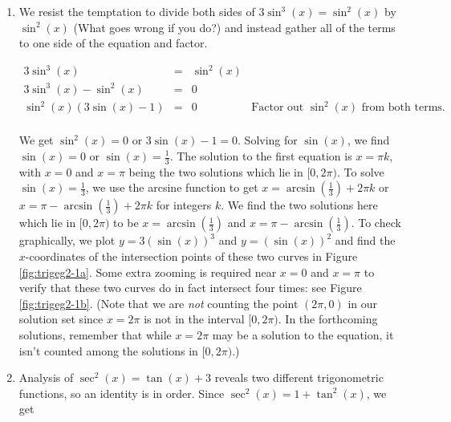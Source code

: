 {
\begin{enumerate}

\item We resist the temptation to divide both sides of $3\sin^{3}(x) = \sin^{2}(x)$ by $\sin^{2}(x)$ (What goes wrong if you do?) and instead gather all of the terms to one side of the equation and factor.

\[ \begin{array}{rclr}

3\sin^{3}(x) & = &  \sin^{2}(x) & \\
3\sin^{3}(x) -  \sin^{2}(x) & = & 0 &  \\
\sin^{2}(x) (3 \sin(x) - 1) & = & 0 & \text{Factor out $\sin^{2}(x)$ from both terms.} \\ \end{array} \]

We get $\sin^{2}(x) = 0$ or $3\sin(x) - 1 = 0$. Solving for $\sin(x)$, we find  $\sin(x) = 0$ or $\sin(x) = \frac{1}{3}$.  The solution to the first equation is $x = \pi k$, with $x = 0$ and $x = \pi$ being the two solutions which lie in $[0,2\pi)$.  To solve $\sin(x) = \frac{1}{3}$, we use the arcsine function to get $x = \arcsin\left(\frac{1}{3}\right) + 2\pi k$ or $x = \pi - \arcsin\left(\frac{1}{3}\right) + 2\pi k$ for integers $k$. We find the two solutions here which lie in $[0,2\pi)$ to be $x = \arcsin\left(\frac{1}{3}\right)$ and $x = \pi - \arcsin\left(\frac{1}{3}\right)$.  To check graphically, we plot $y = 3(\sin(x))^3$ and $y = (\sin(x))^2$ and find the  $x$-coordinates of the intersection points of these two curves in Figure \ref{fig:trigeg2-1a}.  Some extra zooming is required near $x=0$ and $x=\pi$ to verify that these two curves do in fact intersect four times: see Figure \ref{fig:trigeg2-1b}. (Note that we are \textit{not} counting the point $(2\pi,0)$ in our solution set since $x = 2\pi$ is not in the interval $[0,2\pi)$. In the forthcoming solutions, remember that while  $x = 2\pi$ may be a solution to the equation, it isn't counted among the solutions in $[0,2\pi)$.)




\item  Analysis of  $\sec^{2}(x) = \tan(x) + 3$ reveals two different trigonometric functions, so an identity is in order.  Since $\sec^{2}(x) = 1 + \tan^{2}(x)$, we get


\end{enumerate}}

